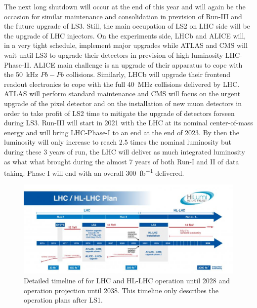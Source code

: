 	The next long shutdown will occur at the end of this year and will again be the occasion for similar maintenance and consolidation in prevision of Run-III and the future upgrade of LS3. Still, the main occupation of LS2 on LHC side will be the upgrade of LHC injectors. On the experiments side, LHCb and ALICE will, in a very tight schedule, implement major upgrades while ATLAS and CMS will wait until LS3 to upgrade their detectors in prevision of high luminosity LHC-Phase-II. ALICE main challenge is an upgrade of their apparatus to cope with the \SI{50}{kHz} $Pb-Pb$ collisions. Similarly, LHCb will upgrade their frontend readout electronics to cope with the full \SI{40}{MHz} collisions delivered by LHC. ATLAS will perform standard maintenance and CMS will focus on the urgent upgrade of the pixel detector and on the installation of new muon detectors in order to take profit of LS2 time to mitigate the upgrade of detectors forseen during LS3. Run-III will start in 2021 with the LHC at its nominal center-of-mass energy and will bring LHC-Phase-I to an end at the end of 2023. By then the luminosity will only increase to reach 2.5 times the nominal luminosity but during these 3 years of run, the LHC will deliver as much integrated luminosity as what what brought during the almost 7 years of both Run-I and II of data taking. Phase-I will end with an overall \SI{300}{fb^{-1}} delivered.\\

	\begin{figure}[H]
		\centering
		\hspace*{-0.1\linewidth}
		\includegraphics[width=1.2\linewidth]{fig/chapt2/HL-LHC-plan-2017.jpg}
		\caption{\label{fig:HL-LHC-Timeline} Detailed timeline of for LHC and HL-LHC operation until 2028 and operation projection until 2038. This timeline only describes the operation plans after LS1.}
	\end{figure}
		
